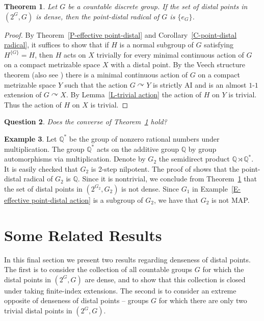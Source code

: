 \documentclass[11pt]{amsart}
\newtheorem{theorem}{Theorem}[section]
\newtheorem{question}[theorem]{Question}
\theoremstyle{definition}
\newtheorem{example}[theorem]{Example}
\numberwithin{equation}{section}
\theoremstyle{definition}
\newcommand{\Qb}{{\mathbb Q}}
\begin{document}
\begin{theorem} \label{P-effective to trivial radical}
Let $G$ be a countable discrete group. If the set of distal points in $(2^G, G)$ is dense, then the point-distal radical of $G$ is $\{e_G\}$.
\end{theorem}
\begin{proof} By Theorem~\ref{P-effective point-distal} and Corollary~\ref{C-point-distal radical}, it suffices to show that if $H$ is a normal subgroup of $G$ satisfying $H^{\{G\}}=H$, then $H$ acts on $X$ trivially for every minimal continuous action of $G$ on a compact metrizable space $X$ with a distal point. By the Veech structure theorem \cite{Veech2} (also see \cite[Theorem VI.4.26]{deVries}) there is a minimal continuous action of $G$ on a compact metrizable space $Y$ such that the action $G\curvearrowright Y$ is strictly AI and is an almost $1$-$1$ extension of $G\curvearrowright X$. By Lemma~\ref{L-trivial action} the action of $H$ on $Y$ is trivial. Thus the action of $H$ on $X$ is trivial. 
\end{proof}

\begin{question} \label{Q-effective vs trivial radical}
Does the converse of Theorem~\ref{P-effective to trivial radical} hold? 
\end{question}

\begin{example}\label{G_2}
Let $\mathbb{Q}^*$ be the group of nonzero rational numbers under multiplication. The group $\mathbb{Q}^*$ acts on the additive group $\Qb$ by group automorphisms via multiplication. Denote by $G_2$ the semidirect product $\mathbb{Q}\rtimes \mathbb{Q}^*$. It is easily checked that $G_2$ is 2-step nilpotent. The proof of \cite[Example 4.3]{Abels83} shows that the point-distal radical of $G_2$ is $\mathbb{Q}$. Since it is nontrivial, we conclude from Theorem~\ref{P-effective to trivial radical} that the set of distal points in $(2^{G_2}, G_2)$ is not dense. Since $G_1$ in Example~\ref{E-effective point-distal action} is a subgroup of $G_2$, we have that $G_2$ is not MAP.
\end{example}




\section{Some Related Results\label{sec:5}}

In this final section we present two results regarding denseness of distal points. The first is to consider the collection of all countable groups $G$ for which the distal points in $(2^G, G)$ are dense, and to show that this collection is closed under taking 
finite-index extensions. The second is to consider an extreme opposite of denseness of distal points -- groups $G$ for which there are only two trivial distal points in $(2^G, G)$.
\end{document}
